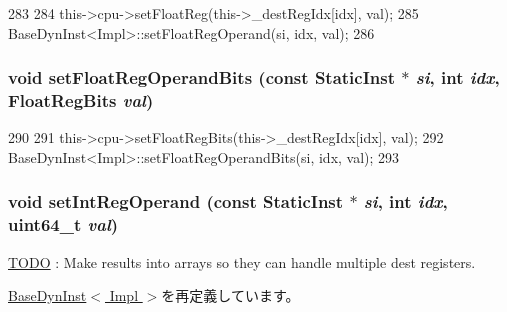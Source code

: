 \begin{DoxyCode}
283     {
284         this->cpu->setFloatReg(this->_destRegIdx[idx], val);
285         BaseDynInst<Impl>::setFloatRegOperand(si, idx, val);
286     }
\end{DoxyCode}
\hypertarget{classBaseO3DynInst_a80a516966713c873cf964af7538dbd37}{
\subsubsection[{setFloatRegOperandBits}]{\setlength{\rightskip}{0pt plus 5cm}void setFloatRegOperandBits (const {\bf StaticInst} $\ast$ {\em si}, \/  int {\em idx}, \/  {\bf FloatRegBits} {\em val})}}
\label{classBaseO3DynInst_a80a516966713c873cf964af7538dbd37}



\begin{DoxyCode}
290     {
291         this->cpu->setFloatRegBits(this->_destRegIdx[idx], val);
292         BaseDynInst<Impl>::setFloatRegOperandBits(si, idx, val);
293     }
\end{DoxyCode}
\hypertarget{classBaseO3DynInst_a654e99f2be7cd298378462ce9651bb44}{
\subsubsection[{setIntRegOperand}]{\setlength{\rightskip}{0pt plus 5cm}void setIntRegOperand (const {\bf StaticInst} $\ast$ {\em si}, \/  int {\em idx}, \/  uint64\_\-t {\em val})}}
\label{classBaseO3DynInst_a654e99f2be7cd298378462ce9651bb44}
\begin{Desc}
\item[\hyperlink{todo__todo000028}{TODO}]: Make results into arrays so they can handle multiple dest registers. \end{Desc}


\hyperlink{classBaseDynInst_a654e99f2be7cd298378462ce9651bb44}{BaseDynInst$<$ Impl $>$}を再定義しています。


